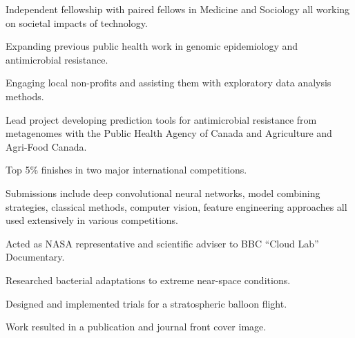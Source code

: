 \documentclass[]{Finlay_Maguire_CV}
\begin{document}
\begin{minipage}[t]{0.66\textwidth}
\begin{tightemize}
\item Independent fellowship with paired fellows in Medicine and Sociology all working on societal impacts of technology.
\item Expanding previous public health work in genomic epidemiology and antimicrobial resistance.
\item Engaging local non-profits and assisting them with exploratory data analysis methods.
\item Lead project developing prediction tools for antimicrobial resistance from metagenomes with the Public Health Agency of Canada and Agriculture and Agri-Food Canada.
\end{tightemize}

\begin{tightemize}
\item Top 5\% finishes in two major international competitions.
\item Submissions include deep convolutional neural networks, model combining strategies, classical methods, computer vision, feature engineering approaches all used extensively in various competitions.
\end{tightemize}
    \vspace{-0.3cm}

\sectionsep
{}
\begin{tightemize}
\item Acted as NASA representative and scientific adviser to BBC ``Cloud Lab'' Documentary.
\item Researched bacterial adaptations to extreme near-space conditions.
\item Designed and implemented trials for a stratospheric balloon flight.
\item Work resulted in a publication and journal front cover image.
\end{tightemize}



\end{minipage}
\end{document}
